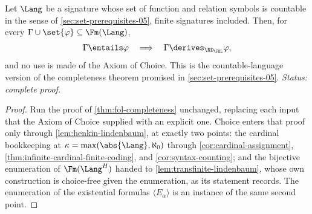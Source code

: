 \begin{corollary}
\label{cor:fol-completeness-countable}
Let \(\Lang\) be a signature whose set of function and relation symbols
is countable in the sense of \cref{sec:set-prerequisites-05}, finite
signatures included.  Then, for every
\(\Gamma\cup\set{\varphi}\subseteq\Fm(\Lang)\),
\[
 \Gamma\entails\varphi
 \quad\Longrightarrow\quad
 \Gamma\derives_{\ND_{\FOL}}\varphi,
\]
and no use is made of the Axiom of Choice.  This is the
countable-language version of the completeness theorem promised in
\cref{sec:set-prerequisites-05}.
\textit{Status: complete proof.}
\end{corollary}
\begin{proof}
Run the proof of \cref{thm:fol-completeness} unchanged, replacing each
input that the Axiom of Choice supplied with an explicit one.  Choice
enters that proof only through \cref{lem:henkin-lindenbaum}, at exactly
two points: the cardinal bookkeeping at
\(\kappa=\max(\abs{\Lang},\aleph_0)\) through
\cref{cor:cardinal-assignment}, \cref{thm:infinite-cardinal-finite-coding},
and \cref{cor:syntax-counting}; and the bijective enumeration of
\(\Fm(\Lang^H)\) handed to \cref{lem:transfinite-lindenbaum}, whose own
construction is choice-free given the enumeration, as its statement
records.  The enumeration of the existential formulas
\(\langle E_\alpha\rangle\) is an instance of the same second point.


\end{proof}
